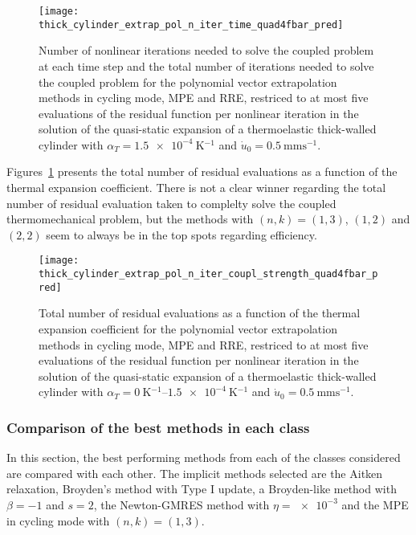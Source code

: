 \begin{figure}[htbp]
  \centering
  \texttt{[image: thick\_cylinder\_extrap\_pol\_n\_iter\_time\_quad4fbar\_pred]}
  \caption{Number of nonlinear iterations needed to solve the coupled problem at each time step and the total number of iterations needed to solve the coupled problem for the polynomial vector extrapolation methods in cycling mode, MPE and RRE, restriced to at most five evaluations of the residual function per nonlinear iteration in the solution of the quasi-static expansion of a thermoelastic thick-walled cylinder with \(\alpha_T=\SI{1.5e-4}{\kelvin^{-1}}\) and \(\dot u_0 =\SI{0.5}{\milli\meter\second^{-1}}\).}
\label{fig:thick_cylinder_extrap_pol_n_iter_time_quad4fbar_pred}
\end{figure}

Figures~\ref{fig:thick_cylinder_extrap_pol_n_iter_time_quad4fbar_pred} presents the total number of residual evaluations as a function of the thermal expansion coefficient.
There is not a clear winner regarding the total number of residual evaluation taken to complelty solve the coupled thermomechanical problem, but the methods with \((n,k)=(1,3)\), \((1,2)\) and \((2,2)\) seem to always be in the top spots regarding efficiency.

\begin{figure}[htbp]
  \centering
  \texttt{[image: thick\_cylinder\_extrap\_pol\_n\_iter\_coupl\_strength\_quad4fbar\_pred]}
  \caption{Total number of residual evaluations as a function of the thermal expansion coefficient for the polynomial vector extrapolation methods in cycling mode, MPE and RRE, restriced to at most five evaluations of the residual function per nonlinear iteration in the solution of the quasi-static expansion of a thermoelastic thick-walled cylinder with \(\alpha_T=\SIrange{0}{1.5e-4}{\kelvin^{-1}}\) and \(\dot u_0 =\SI{0.5}{\milli\meter\second^{-1}}\).}
\label{fig:thick_cylinder_extrap_pol_n_iter_coupl_strength_quad4fbar_pred}
\end{figure}

\FloatBarrier

\subsubsection{Comparison of the best methods in each class}

In this section, the best performing methods from each of the classes considered are compared with each other.
The implicit methods selected are the Aitken relaxation, Broyden's method with Type I update, a Broyden-like method with \(\beta=-1\) and \(s=2\), the Newton-GMRES method with \(\eta=\num{e-3}\) and the MPE in cycling mode with \((n,k)=(1,3)\).

